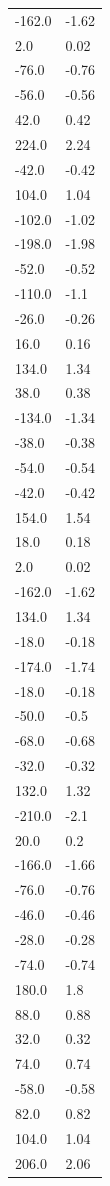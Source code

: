 \begin{longtable}{ll}
-162.0 & -1.62 \\
2.0 & 0.02 \\
-76.0 & -0.76 \\
-56.0 & -0.56 \\
42.0 & 0.42 \\
224.0 & 2.24 \\
-42.0 & -0.42 \\
104.0 & 1.04 \\
-102.0 & -1.02 \\
-198.0 & -1.98 \\
-52.0 & -0.52 \\
-110.0 & -1.1 \\
-26.0 & -0.26 \\
16.0 & 0.16 \\
134.0 & 1.34 \\
38.0 & 0.38 \\
-134.0 & -1.34 \\
-38.0 & -0.38 \\
-54.0 & -0.54 \\
-42.0 & -0.42 \\
154.0 & 1.54 \\
18.0 & 0.18 \\
2.0 & 0.02 \\
-162.0 & -1.62 \\
134.0 & 1.34 \\
-18.0 & -0.18 \\
-174.0 & -1.74 \\
-18.0 & -0.18 \\
-50.0 & -0.5 \\
-68.0 & -0.68 \\
-32.0 & -0.32 \\
132.0 & 1.32 \\
-210.0 & -2.1 \\
20.0 & 0.2 \\
-166.0 & -1.66 \\
-76.0 & -0.76 \\
-46.0 & -0.46 \\
-28.0 & -0.28 \\
-74.0 & -0.74 \\
180.0 & 1.8 \\
88.0 & 0.88 \\
32.0 & 0.32 \\
74.0 & 0.74 \\
-58.0 & -0.58 \\
82.0 & 0.82 \\
104.0 & 1.04 \\
206.0 & 2.06 \\

\end{longtable}
